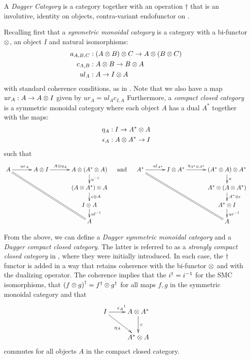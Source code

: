 \begin{definition}
  A \emph{Dagger Category}\cite{selinger05:dagger} is a category \C together with an operation
  $\dagger$ that is an involutive, identity on objects, contra-variant endofunctor on \C.
\end{definition}
Recalling first that a \emph{symmetric monoidal category} is a category \B with a bi-functor $\otimes$,
an object $I$ and natural isomorphisms:
\begin{align*}
  a_{A,B,C}&: (A\otimes B)\otimes C \to A\otimes (B\otimes C)\\
  c_{A,B} &:A\otimes B \to B\otimes A\\
  ul_A &:A \to I \otimes A
\end{align*}
with standard coherence conditions, as in \cite{maclan97:categorieswrkmath}. Note that we
also have a map $ur_A: A \to A\otimes I$ given by $ur_A = ul_A c_{I,A}$ Furthermore, a \emph{compact
closed category} \C is a symmetric monoidal category where each object $A$ has a dual $A^{*}$
together with the maps:
\begin{align*}
  \eta_A:I \to {A}^{*} \otimes A\\
  \epsilon_A : A\otimes{A}^{*} \to I
\end{align*}
such that
\[
  \xymatrix@C+8pt@R-10pt{
    A \ar[r]^{ur_A} \ar@{=}[dddrr]
      & A\* I \ar[r]^(.4){A\*\eta_A}
      & A\* (\dual{A}\*A) \ar[d]^{a^{-1}}\\
    & & (A\*\dual{A})\*A \ar[d]^{\epsilon\*A}\\
    & & I\* A \ar[d]^{ul^{-1}}\\
    & & A
  }
  \quad\text{ and  }\quad
  \xymatrix@C+8pt@R-10pt{
    \dual{A} \ar[r]^{ul_{\dual{A}}} \ar@{=}[dddrr]
      & I\*\dual{A} \ar[r]^(.4){\eta_{\dual{A}\*\dual{A}}}
      & (\dual{A}\*A)\*\dual{A} \ar[d]^{a}\\
    & & \dual{A}\*(A\*\dual{A}) \ar[d]^{\dual{A}\*\epsilon}\\
    & & \dual{A}\*I \ar[d]^{ur^{-1}}\\
    & & A
  }
\]

From the above, we can define a \emph{Dagger symmetric monoidal category} and a \emph{Dagger
compact closed category}. The latter is referred to as a \emph{strongly compact closed category} in
\cite{abramsky02:traces}, where they were initially introduced. In each case, the $\dagger$ functor
is added in a way that retains coherence with the bi-functor $\otimes$ and with the dualizing operator.
The coherence implies that the ${i}^{\dagger} = i^{-1}$ for the SMC isomorphisms, that ${(f\otimes g)}^{\dagger} =
{f}^{\dagger}\otimes{g}^{\dagger}$ for all maps $f,g$ in the symmetric monoidal category and that
\[
  \xymatrix{
    I \ar[dr]_{\eta_A} \ar[r]^{\dgr{\epsilon_A}} & A\* \dual{A} \ar[d]^{c} \\
    &\dual{A}\*A
  }
\]
commutes for all objects $A$ in the compact closed category.


